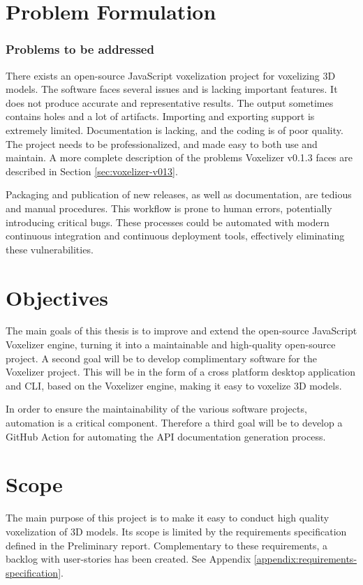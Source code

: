 \section{Problem Formulation}

\subsubsection{Problems to be addressed}
There exists an open-source JavaScript voxelization project for voxelizing 3D models. The software faces several issues and is lacking important features. It does not produce accurate and representative results. The output sometimes contains holes and a lot of artifacts. Importing and exporting support is extremely limited. Documentation is lacking, and the coding is of poor quality. The project needs to be professionalized, and made easy to both use and maintain.
A more complete description of the problems Voxelizer v0.1.3 faces are described in Section \ref{sec:voxelizer-v013}.

Packaging and publication of new releases, as well as documentation, are tedious and manual procedures. This workflow is prone to human errors, potentially introducing critical bugs. These processes could be automated with modern continuous integration and continuous deployment tools, effectively eliminating these vulnerabilities.

\section{Objectives}
The main goals of this thesis is to improve and extend the open-source JavaScript Voxelizer engine, turning it into a maintainable and high-quality open-source project. A second goal will be to develop complimentary software for the Voxelizer project. This will be in the form of a cross platform desktop application and CLI, based on the Voxelizer engine, making it easy to voxelize 3D models.

In order to ensure the maintainability of the various software projects, automation is a critical component. Therefore a third goal will be to develop a GitHub Action for automating the API documentation generation process.

\section{Scope}
The main purpose of this project is to make it easy to conduct high quality voxelization of 3D models. Its scope is limited by the requirements specification defined in the Preliminary report. Complementary to these requirements, a backlog with user-stories has been created. See Appendix \ref{appendix:requirements-specification}.

